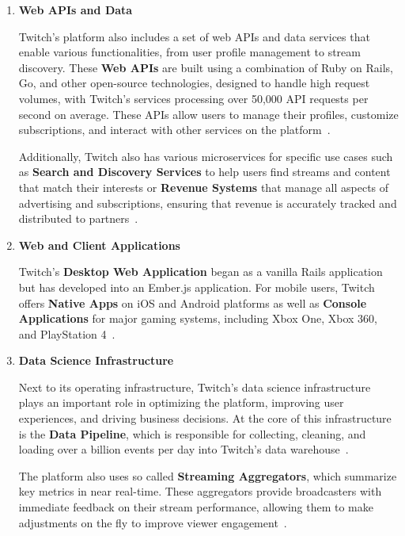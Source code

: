 \begin{enumerate}
    \item \textbf{Web \ac{API}s and Data}

    Twitch’s platform also includes a set of web \ac{API}s and data services that enable various functionalities, from user profile management to stream discovery. These \textbf{Web \ac{API}s} are built using a combination of Ruby on Rails, Go, and other open-source technologies, designed to handle high request volumes, with Twitch's services processing over 50,000 \ac{API} requests per second on average. These \ac{API}s allow users to manage their profiles, customize subscriptions, and interact with other services on the platform~\parencite{twitch_engineering}.

    Additionally, Twitch also has various microservices for specific use cases such as \textbf{Search and Discovery Services} to help users find streams and content that match their interests or \textbf{Revenue Systems} that manage all aspects of advertising and subscriptions, ensuring that revenue is accurately tracked and distributed to partners~\parencite{twitch_engineering}. 
    
    \item \textbf{Web and Client Applications}
    
    Twitch’s \textbf{Desktop Web Application} began as a vanilla Rails application but has developed into an Ember.js application. For mobile users, Twitch offers \textbf{Native Apps} on iOS and Android platforms as well as \textbf{Console Applications} for major gaming systems, including Xbox One, Xbox 360, and PlayStation 4~\parencite{twitch_engineering}.

    \item \textbf{Data Science Infrastructure}

    Next to its operating infrastructure, Twitch’s data science infrastructure plays an important role in optimizing the platform, improving user experiences, and driving business decisions. At the core of this infrastructure is the \textbf{Data Pipeline}, which is responsible for collecting, cleaning, and loading over a billion events per day into Twitch’s data warehouse~\parencite{twitch_engineering}. 

    The platform also uses so called \textbf{Streaming Aggregators}, which summarize key metrics in near real-time. These aggregators provide broadcasters with immediate feedback on their stream performance, allowing them to make adjustments on the fly to improve viewer engagement~\parencite{twitch_engineering}.


\end{enumerate}
